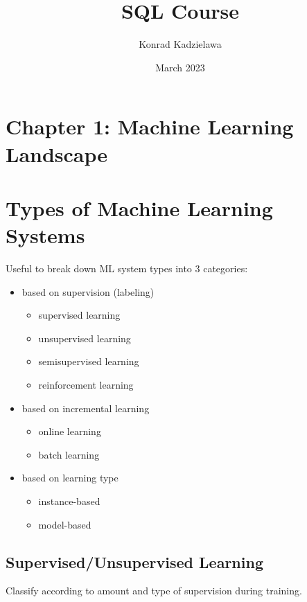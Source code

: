 \documentclass{article}
\begin{document}
\title{SQL Course}
\author{Konrad Kadzielawa}
\date{March 2023}
\maketitle


\section*{Chapter 1: Machine Learning Landscape}

\section{Types of Machine Learning Systems}
Useful to break down ML system types into 3 categories:

\begin{itemize}	
	\item based on supervision (labeling)
		\begin{itemize}
			\item supervised learning
			\item unsupervised learning
			\item semisupervised learning
			\item reinforcement learning
		\end{itemize}		

	\item based on incremental learning 
		\begin{itemize}
			\item online learning
			\item batch learning
		\end{itemize}		

	\item based on learning type
		\begin{itemize}
			\item instance-based
			\item model-based
		\end{itemize}		
\end{itemize}


\subsection{Supervised/Unsupervised Learning}
Classify according to amount and type of supervision during training.
\end{document}
